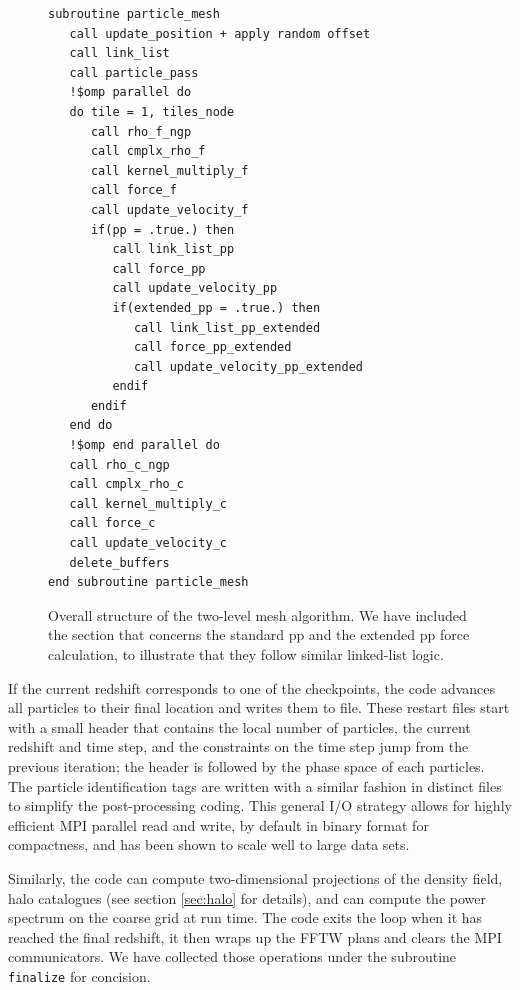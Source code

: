\documentclass[useAMS,usenatbib]{mn2e}
\begin{document}
\begin{figure}
\begin{verbatim}
subroutine particle_mesh
   call update_position + apply random offset
   call link_list
   call particle_pass
   !$omp parallel do
   do tile = 1, tiles_node
      call rho_f_ngp
      call cmplx_rho_f
      call kernel_multiply_f
      call force_f
      call update_velocity_f
      if(pp = .true.) then       
         call link_list_pp
         call force_pp
         call update_velocity_pp
         if(extended_pp = .true.) then
            call link_list_pp_extended
            call force_pp_extended
            call update_velocity_pp_extended       
         endif
      endif
   end do
   !$omp end parallel do
   call rho_c_ngp
   call cmplx_rho_c
   call kernel_multiply_c
   call force_c
   call update_velocity_c      
   delete_buffers
end subroutine particle_mesh
\end{verbatim}
\caption{Overall structure of the two-level mesh algorithm. We have included the section that concerns the standard pp and the extended pp force calculation, to illustrate that they follow similar linked-list logic. }
\label{fig:particle_mesh}
\end{figure}


If the current redshift corresponds to one of the checkpoints, the code advances all particles to their final location
and writes them to file. 
These restart files start with a small header that 
contains the local  number of particles, the current redshift and time step, and the constraints on the time step jump
from the previous iteration; the header is followed by the phase space of each particles. The particle identification tags are written 
with a similar fashion in distinct files to simplify the post-processing coding. 
This general I/O strategy allows for highly efficient {\small MPI} parallel read and write,
by default in binary format for compactness, and has been shown to scale well to large data sets.

Similarly, the code can compute two-dimensional projections of the density field, halo catalogues (see section \ref{sec:halo} for details), and can compute the power spectrum on the coarse grid at run time. 
The code exits the loop when it has reached the final redshift, it then wraps up the {\small FFTW} plans 
and clears the {\small MPI} communicators. We have collected those operations under the subroutine {\tt finalize} for concision.
\end{document}

